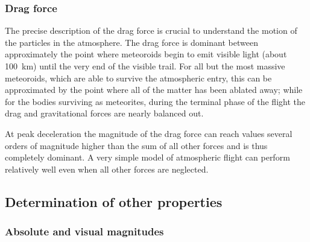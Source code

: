         \subsubsection{Drag force} \label{aafd}
            The precise description of the drag force is crucial to understand the motion
            of the particles in the atmosphere. The drag force is dominant between approximately
            the point where meteoroids begin to emit visible light (about \SI{100}{\kilo\metre})
            until the very end of the visible trail. For all but the most massive meteoroids,
            which are able to survive the atmospheric entry, this can be approximated
            by the point where all of the matter has been ablated away; while for the bodies
            surviving as meteorites, during the terminal phase of the flight the drag and
            gravitational forces are nearly balanced out.

            At peak deceleration the magnitude of the drag force can reach values several orders of magnitude
            higher than the sum of all other forces and is thus completely dominant.
            A very simple model of atmospheric flight can perform relatively well even when all other forces are neglected.

    \subsection{Determination of other properties} \label{aap}

        \subsubsection{Absolute and visual magnitudes} \label{aapm}


